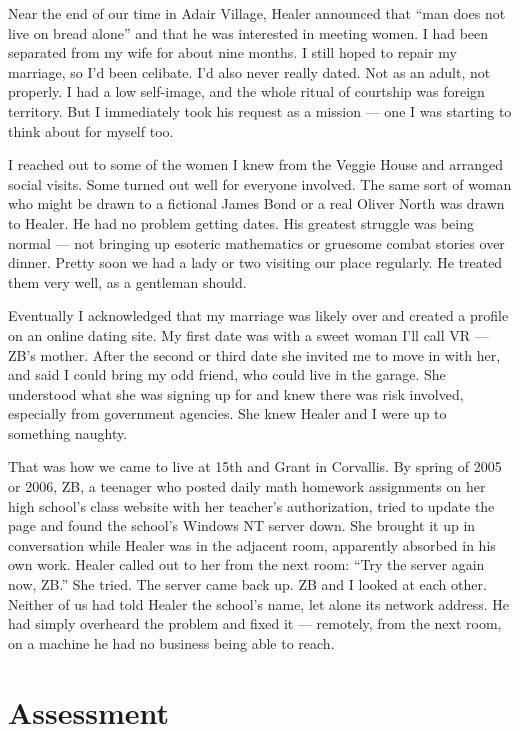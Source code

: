 Near the end of our time in Adair Village, Healer announced that ``man does not live on bread alone'' and that he was interested in meeting women. I had been separated from my wife for about nine months. I still hoped to repair my marriage, so I'd been celibate. I'd also never really dated. Not as an adult, not properly. I had a low self-image, and the whole ritual of courtship was foreign territory. But I immediately took his request as a mission --- one I was starting to think about for myself too.

I reached out to some of the women I knew from the Veggie House and arranged social visits. Some turned out well for everyone involved. The same sort of woman who might be drawn to a fictional James Bond or a real Oliver North was drawn to Healer. He had no problem getting dates. His greatest struggle was being normal --- not bringing up esoteric mathematics or gruesome combat stories over dinner. Pretty soon we had a lady or two visiting our place regularly. He treated them very well, as a gentleman should.

Eventually I acknowledged that my marriage was likely over and created a profile on an online dating site. My first date was with a sweet woman I'll call VR --- ZB's mother. After the second or third date she invited me to move in with her, and said I could bring my odd friend, who could live in the garage. She understood what she was signing up for and knew there was risk involved, especially from government agencies. She knew Healer and I were up to something naughty.

That was how we came to live at 15th and Grant in Corvallis. By spring of 2005 or 2006, ZB, a teenager who posted daily math homework assignments on her high school's class website with her teacher's authorization, tried to update the page and found the school's Windows NT server down. She brought it up in conversation while Healer was in the adjacent room, apparently absorbed in his own work. Healer called out to her from the next room: ``Try the server again now, ZB.'' She tried. The server came back up. ZB and I looked at each other. Neither of us had told Healer the school's name, let alone its network address. He had simply overheard the problem and fixed it --- remotely, from the next room, on a machine he had no business being able to reach.

\section*{Assessment}
\label{pos02:assessment}

